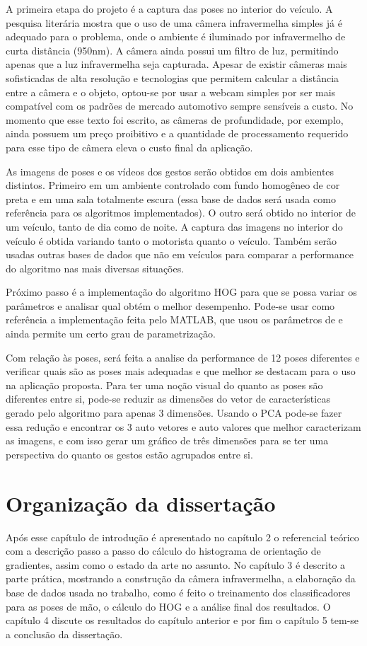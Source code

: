 A primeira etapa do projeto é a captura das poses no interior do veículo. A pesquisa literária mostra \cite{zobl2004gesture, akyol2000gesture} que o uso de uma câmera infravermelha simples já é adequado para o problema, onde o ambiente é iluminado por infravermelho de curta distância (950nm). A câmera ainda possui um filtro de luz, permitindo apenas que a luz infravermelha seja capturada. Apesar de existir câmeras mais sofisticadas de alta resolução e tecnologias que permitem calcular a distância entre a câmera e o objeto, optou-se por usar a webcam simples por ser mais compatível com os padrões de mercado automotivo sempre sensíveis a custo. No momento que esse texto foi escrito, as câmeras de profundidade, por exemplo, ainda possuem um preço proibitivo e a quantidade de processamento requerido para esse tipo de câmera eleva o custo final da aplicação.

As imagens de poses e os vídeos dos gestos serão obtidos em  dois ambientes distintos. Primeiro em um ambiente controlado com fundo homogêneo de cor preta e em uma sala totalmente escura (essa base de dados será usada como referência para os algoritmos implementados). O outro será obtido no interior de um veículo, tanto de dia como de noite. A captura das imagens no interior do veículo é obtida variando tanto o motorista quanto o veículo. Também serão usadas outras bases de dados que não em veículos para comparar a performance do algoritmo nas mais diversas situações.

Próximo passo é a implementação do algoritmo HOG para que se possa variar os parâmetros e analisar qual obtém o melhor desempenho. Pode-se usar como referência a implementação feita pelo MATLAB, que usou os parâmetros de  e ainda permite um certo grau de parametrização.

Com relação às poses, será feita a analise da performance de 12 poses diferentes e verificar quais são as poses mais adequadas e que melhor se destacam para o uso na aplicação proposta. Para ter uma noção visual do quanto as poses são diferentes entre si, pode-se reduzir as dimensões do vetor de características gerado pelo algoritmo para apenas 3 dimensões. Usando o PCA pode-se fazer essa redução e encontrar os 3 auto vetores e auto valores que melhor caracterizam as imagens, e com isso gerar um gráfico de três dimensões para se ter uma perspectiva do quanto os gestos estão agrupados entre si.

\section{Organização da dissertação}

Após esse capítulo de introdução é apresentado no capítulo 2 o referencial teórico com a descrição passo a passo do cálculo do histograma de orientação de gradientes, assim como o estado da arte no assunto. No capítulo 3 é descrito a parte prática, mostrando a construção da câmera infravermelha, a elaboração da base de dados usada no trabalho, como é feito o treinamento dos classificadores para as poses de mão, o cálculo do HOG e a análise final dos resultados. O capítulo 4 discute os resultados do capítulo anterior e por fim o capítulo 5 tem-se a conclusão da dissertação.

